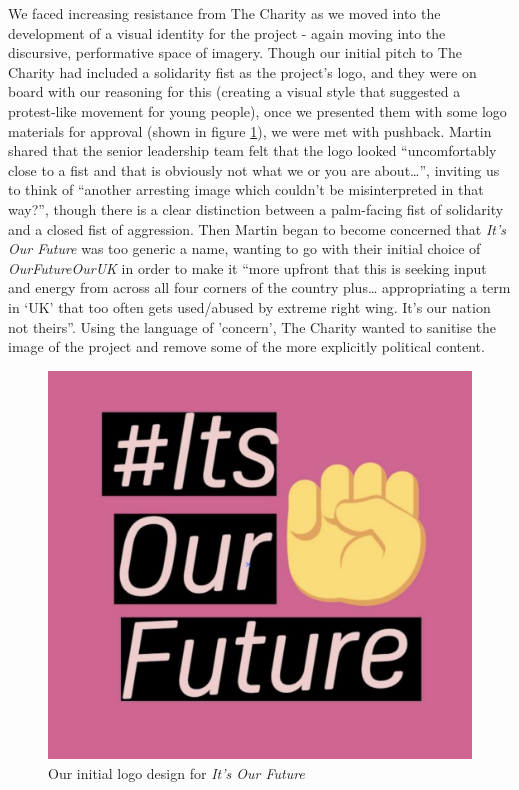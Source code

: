 We faced increasing resistance from The Charity as we moved into the development of a visual identity for the project - again moving into the discursive, performative space of imagery. Though our initial pitch to The Charity had included a solidarity fist as the project's logo, and they were on board with our reasoning for this (creating a visual style that suggested a protest-like movement for young people), once we presented them with some logo materials for approval (shown in figure \ref{fig:iof-logo-1}), we were met with pushback. Martin shared that the senior leadership team felt that the logo looked “uncomfortably close to a fist and that is obviously not what we or you are about…”, inviting us to think of “another arresting image which couldn’t be misinterpreted in that way?”, though there is a clear distinction between a palm-facing fist of solidarity and a closed fist of aggression. Then Martin began to become concerned that \textit{It’s Our Future }was too generic a name, wanting to go with their initial choice of \textit{OurFutureOurUK} in order to make it “more upfront that this is seeking input and energy from across all four corners of the country plus… appropriating a term in ‘UK’ that too often gets used/abused by extreme right wing. It’s our nation not theirs”. Using the language of 'concern', The Charity wanted to sanitise the image of the project and remove some of the more explicitly political content.

\begin{figure}
    \centering
    \includegraphics[width=0.25\linewidth]{Images/7/iof-logo-1.png}
    \caption{Our initial logo design for \textit{It's Our Future}}
    \label{fig:iof-logo-1}
\end{figure}

